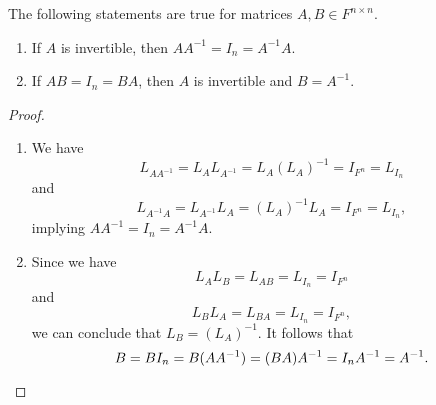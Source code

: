 \begin{proposition}
  \label{prop:invertible-matrix}
  The following statements are true for matrices $A, B \in F^{n \times n}$.
  \begin{enumerate}
    \item If $A$ is invertible, then $AA^{-1} = I_n = A^{-1}A$.
    \item If $AB = I_n = BA$, then $A$ is invertible and $B = A^{-1}$.
  \end{enumerate}
\end{proposition}
\begin{proof}
  \leavevmode
  \begin{enumerate}
    \item We have
    \begin{equation*}
      L_{AA^{-1}} = L_AL_{A^{-1}} = L_A(L_A)^{-1} = I_{F^n} = L_{I_n}
    \end{equation*}
    and
    \begin{equation*}
      L_{A^{-1}A} = L_{A^{-1}}L_A = (L_A)^{-1}L_A = I_{F^n} = L_{I_n},
    \end{equation*}
    implying $AA^{-1} = I_n = A^{-1}A$.

    \item Since we have
    \begin{equation*}
      L_AL_B = L_{AB} = L_{I_n} = I_{F^n}
    \end{equation*}
    and
    \begin{equation*}
      L_BL_A = L_{BA} = L_{I_n} = I_{F^n},
    \end{equation*}
    we can conclude that $L_B = (L_A)^{-1}$.
    It follows that
    \begin{equation*}
      B = BI_n = B(AA^{-1}) = (BA)A^{-1} = I_nA^{-1} = A^{-1}.
      \qedhere
    \end{equation*}
  \end{enumerate}
\end{proof}